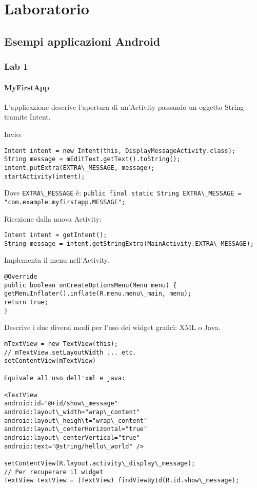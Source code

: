 \part{Laboratorio}

\chapter{Esempi applicazioni Android}


\section{Lab 1}
\subsection{MyFirstApp}
L'applicazione descrive l'apertura di un'Activity passando un oggetto String tramite Intent.

Invio:
\begin{lstlisting}
Intent intent = new Intent(this, DisplayMessageActivity.class);
String message = mEditText.getText().toString();
intent.putExtra(EXTRA\_MESSAGE, message);
startActivity(intent);
\end{lstlisting}

Dove \lstinline|EXTRA\_MESSAGE| è:
\lstinline|public final static String EXTRA\_MESSAGE = "com.example.myfirstapp.MESSAGE";|

Ricezione dalla nuova Activity:
\begin{lstlisting}
Intent intent = getIntent();
String message = intent.getStringExtra(MainActivity.EXTRA\_MESSAGE);
\end{lstlisting}


Implementa il menu nell'Activity.
\begin{lstlisting}
@Override
public boolean onCreateOptionsMenu(Menu menu) {
getMenuInflater().inflate(R.menu.menu\_main, menu);
return true;
}
\end{lstlisting}


Descrive i due diversi modi per l'uso dei widget grafici: XML o Java.
\begin{lstlisting}
mTextView = new TextView(this);
// mTextView.setLayoutWidth ... etc.
setContentView(mTextView)

Equivale all'uso dell'xml e java:

<TextView
android:id="@+id/show\_message"
android:layout\_width="wrap\_content"
android:layout\_heigh\t="wrap\_content"
android:layout\_centerHorizontal="true"
android:layout\_centerVertical="true"
android:text="@string/hello\_world" />

setContentView(R.layout.activity\_display\_message);
// Per recuperare il widget
TextView textView = (TextView) findViewById(R.id.show\_message);
\end{lstlisting}

